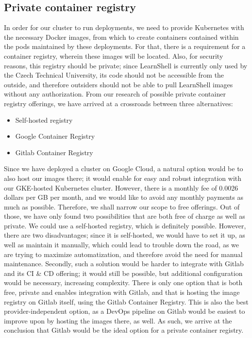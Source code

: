 \documentclass[thesis=B,english]{FITthesis}[2019/12/23]
\begin{document}
\subsection{Private container registry}

In order for our cluster to run deployments, we need to provide Kubernetes with the necessary Docker images, from which to create containers contained within the pods maintained by these deployments. For that, there is a requirement for a container registry, wherein these images will be located. Also, for security reasons, this registry should be private; since LearnShell is currently only used by the Czech Technical University, its code should not be accessible from the outside, and therefore outsiders should not be able to pull LearnShell images without any authorization. From our research of possible private container registry offerings, we have arrived at a crossroads between three alternatives:

\begin{itemize}
  \setlength\itemsep{0em}
  \item Self-hosted registry
  \item Google Container Registry
  \item Gitlab Container Registry
\end{itemize}

Since we have deployed a cluster on Google Cloud, a natural option would be to also host our images there; it would enable for easy and robust integration with our GKE-hosted Kubernetes cluster. However, there is a monthly 
fee of 0.0026 dollars per GB per month, and we would like to avoid any monthly payments as much as possible. Therefore, we shall narrow our scope to free offerings. Out of those, we have only found two possibilities that are both free of charge as well as private. We could use a self-hosted registry, which is definitely possible. However, there are two disadvantages; since it is self-hosted, we would have to set it up, as well as maintain it manually, which could lead to trouble down the road, as we are trying to maximize automatization, and therefore avoid the need for manual maintenance. Secondly, such a solution would be harder to integrate with Gitlab and its CI \& CD offering; it would still be possible, but additional configuration would be necessary, increasing complexity. There is only one option that is both free, private and enables integration with Gitlab, and that is hosting the image registry on Gitlab itself, using the Gitlab Container Registry. This is also the best provider-independent option, as a DevOps pipeline on Gitlab would be easiest to improve upon by hosting the images there, as well.
\newline
As such, we arrive at the conclusion that Gitlab would be the ideal option for a private container registry.
\end{document}
